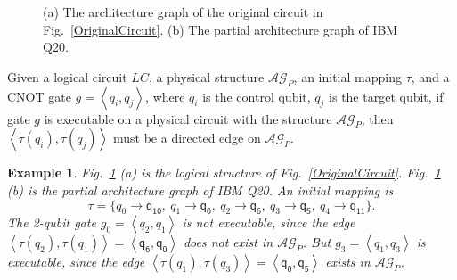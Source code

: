 \documentclass[journal]{IEEEtran}
\newtheorem{example}{Example}
\begin{document}
\begin{figure}[htbp]
\begin{center}
{
			}
\end{center}
	
	\caption{(a) The architecture graph of the original circuit in Fig.~\ref{OriginalCircuit}. (b) The partial architecture graph of IBM Q20.}
	\label{LAGPAG}
\end{figure}
	

Given a logical circuit $LC$, a physical structure $\mathcal{AG}_{P}$, an initial mapping $\tau$, and a CNOT gate $g=\left \langle \textit{q}_\textit{i},\textit{q}_\textit{j}\right \rangle $, where $\textit{q}_\textit{i}$ is the control qubit, $\textit{q}_\textit{j}$ is the target qubit,
if gate $g$ is executable on a physical circuit with the structure $\mathcal{AG}_{P}$, then
$\left \langle\tau(\textit{q}_\textit{i}),\tau(\textit{q}_\textit{j})\right \rangle $ 
must be a directed edge on $\mathcal{AG}_{P}$.


\begin{example}
	Fig.~\ref{LAGPAG} (a) is the logical structure of Fig.~\ref{OriginalCircuit}. 
	Fig.~\ref{LAGPAG} (b) is the partial architecture graph of IBM Q20. An initial mapping is 
	$$\tau=\{\textit{q}_\textit{0}\rightarrow  \textsf{q}_{\textsf{10}},\ \textit{q}_\textit{1}\rightarrow \textsf{q}_{\textsf{0}},\ 
	\textit{q}_\textit{2}\rightarrow  \textsf{q}_{\textsf{6}},\ \textit{q}_\textit{3}\rightarrow  \textsf{q}_{\textsf{5}},\ \textit{q}_\textit{4}\rightarrow  \textsf{q}_{\textsf{11}}\} .$$
The 2-qubit gate	$g_{0}=\left \langle \textit{q}_\textit{2},\textit{q}_\textit{1}\right \rangle $ is not executable, since the edge $\left \langle \tau(\textit{q}_\textit{2}),\tau(\textit{q}_\textit{1})\right \rangle =\left \langle \textsf{q}_{\textsf{6}},\textsf{q}_{\textsf{0}}\right \rangle $ does not exist in $\mathcal{AG}_{P}$.
	But $g_{3}=\left \langle \textit{q}_\textit{1},\textit{q}_\textit{3}\right \rangle $ is executable, since 
	the edge $\left \langle \tau(\textit{q}_\textit{1}),\tau(\textit{q}_\textit{3})\right \rangle =\left \langle \textsf{q}_{\textsf{0}},\textsf{q}_{\textsf{5}}\right \rangle $  exists in $\mathcal{AG}_{P}$.
\end{example}
\end{document}
